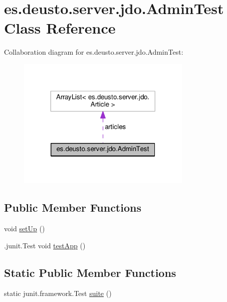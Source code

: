 \hypertarget{classes_1_1deusto_1_1server_1_1jdo_1_1_admin_test}{}\section{es.\+deusto.\+server.\+jdo.\+Admin\+Test Class Reference}
\label{classes_1_1deusto_1_1server_1_1jdo_1_1_admin_test}


Collaboration diagram for es.\+deusto.\+server.\+jdo.\+Admin\+Test\+:
\nopagebreak
\begin{figure}[H]
\begin{center}
\leavevmode
\includegraphics[width=236pt]{classes_1_1deusto_1_1server_1_1jdo_1_1_admin_test__coll__graph}
\end{center}
\end{figure}
\subsection*{Public Member Functions}
\begin{DoxyCompactItemize}
\item 
void \hyperlink{classes_1_1deusto_1_1server_1_1jdo_1_1_admin_test_acaa555000602cd83a7e73550a7f114b4}{set\+Up} ()
\item 
.junit.\+Test void \hyperlink{classes_1_1deusto_1_1server_1_1jdo_1_1_admin_test_aba3d4e2c7110a3bc1c7557f4491e1691}{test\+App} ()
\end{DoxyCompactItemize}
\subsection*{Static Public Member Functions}
\begin{DoxyCompactItemize}
\item 
static junit.\+framework.\+Test \hyperlink{classes_1_1deusto_1_1server_1_1jdo_1_1_admin_test_aa2992f98029130ba303b2a7753d3c35d}{suite} ()
\end{DoxyCompactItemize}


